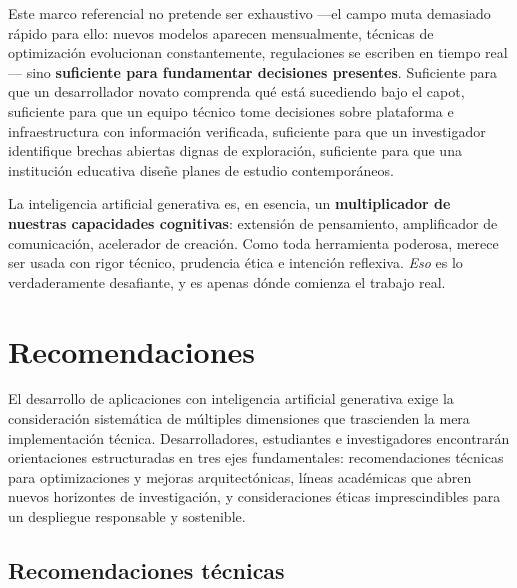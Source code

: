 \documentclass[12pt,a4paper]{report}
\numberwithin{figure}{section}
\begin{document}
Este marco referencial no pretende ser exhaustivo —el campo muta demasiado rápido para ello: nuevos modelos aparecen mensualmente, técnicas de optimización evolucionan constantemente, regulaciones se escriben en tiempo real— sino \textbf{suficiente para fundamentar decisiones presentes}. Suficiente para que un desarrollador novato comprenda qué está sucediendo bajo el capot, suficiente para que un equipo técnico tome decisiones sobre plataforma e infraestructura con información verificada, suficiente para que un investigador identifique brechas abiertas dignas de exploración, suficiente para que una institución educativa diseñe planes de estudio contemporáneos.

La inteligencia artificial generativa es, en esencia, un \textbf{multiplicador de nuestras capacidades cognitivas}: extensión de pensamiento, amplificador de comunicación, acelerador de creación. Como toda herramienta poderosa, merece ser usada con rigor técnico, prudencia ética e intención reflexiva. \textit{Eso} es lo verdaderamente desafiante, y es apenas dónde comienza el trabajo real.

\newpage

\chapter{Recomendaciones}
\label{ch:recomendaciones}

El desarrollo de aplicaciones con inteligencia artificial generativa exige la consideración sistemática de múltiples dimensiones que trascienden la mera implementación técnica. Desarrolladores, estudiantes e investigadores encontrarán orientaciones estructuradas en tres ejes fundamentales: recomendaciones técnicas para optimizaciones y mejoras arquitectónicas, líneas académicas que abren nuevos horizontes de investigación, y consideraciones éticas imprescindibles para un despliegue responsable y sostenible.

\vspace{1em}

\section{Recomendaciones técnicas}
\label{sec:recomendaciones_tecnicas}
\end{document}

